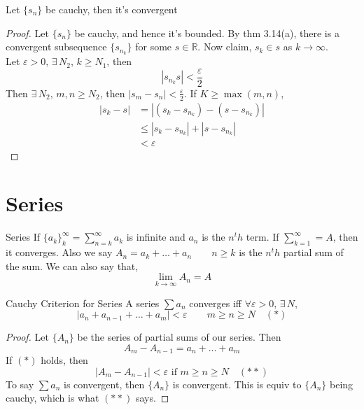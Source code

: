 \documentclass{article}
\newcommand{\R}{\mathbb{R}}
\newcommand{\e}{\varepsilon}
\newcommand{\ex}{\exists\,}
\begin{document}
{{{{\noindent\begin{lemma}{}{}
  Let $\{ s_n \}$ be cauchy, then it's convergent
\end{lemma}\vspace{10pt}
\begin{proof}
  Let $\{ s_n \}$ be cauchy, and hence it's bounded. By thm 3.14(a), there is a convergent subsequence $\{ s_{n_k} \}$ for some $s\in\R$. Now claim, $\displaystyle{s_k \in s}$ as $\displaystyle{k \to \infty}$.\\

  Let $\e > 0,\, \ex N_2$, $k \ge N_1$, then
  $$ |s_{n_k} s| < \frac{\e}{2} $$
  Then $\ex N_2, \, m, n \ge N_2$, then $|s_m - s_n| < \frac{\e}{2}$. If $K \ge \max(m, n)$,
  \begin{align*}
    |s_k - s| &= |(s_k - s_{n_k}) - (s - s_{n_k})|\\
    &\le |s_k - s_{n_k}| + |s - s_{n_k}|\\
    &< \e
  \end{align*}
\end{proof}

\section{Series}
\noindent\begin{definition}{Series}{}
   If $\displaystyle{\{ a_k \}^\infty_k = \sum_{n = k}^\infty a_k}$ is infinite and $a_n$ is the $n^th$ term. If $\displaystyle{\sum_{k=1}^\infty} = A$, then it converges. Also we say $\displaystyle{A_n = a_k + \dots + a_n \qquad n \ge k}$ is the $n^th$ partial sum of the sum. We can also say that,
   $$ \lim_{k\to\infty}{A_n} = A $$
\end{definition}\vspace{10pt}

\noindent\begin{theorem}{Cauchy Criterion for Series}{}
   A series $\sum a_n$ converges iff $\forall \e > 0,\,\ex N$,
   $$ |a_n + a_{n-1} +\dots + a_m| < \e \qquad m \ge n \ge N \quad (*)$$
\end{theorem}\vspace{10pt}

\begin{proof}
  Let $\{ A_n \}$ be the series of partial sums of our series. Then
  $${A_m - A_{n-1} = a_n + \dots + a_m}$$
  If $(*)$ holds, then
  $$|A_m - A_{n-1}| < \e \text{ if } m \ge n \ge N \quad (**)$$
  To say $\sum a_n$ is convergent, then $\{ A_n \}$ is convergent. This is equiv to $\{ A_n \}$ being cauchy, which is what $(**)$ says.
\end{proof}

}}}}
\end{document}
